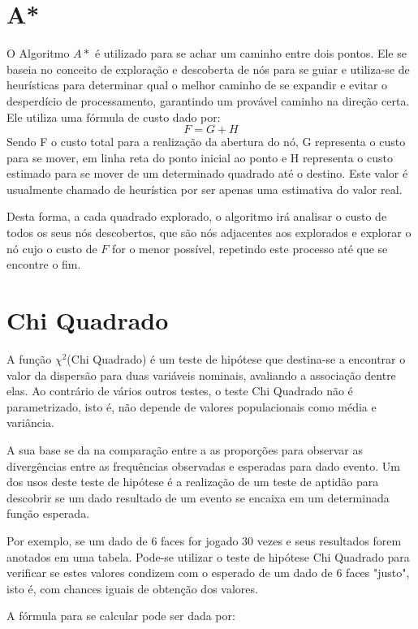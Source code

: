 \section{A*}
O Algoritmo $A*$ \cite{Astar} é utilizado para se achar um caminho entre dois pontos. Ele se baseia no conceito de exploração e descoberta de nós para se guiar e utiliza-se de heurísticas para determinar qual o melhor caminho de se expandir e evitar o desperdício de processamento, garantindo um provável caminho na direção certa. 
Ele utiliza uma fórmula de custo dado por:
\begin{equation}
	F = G + H
\end{equation}
Sendo F o custo total para a realização da abertura do nó, G representa o custo para se mover, em linha reta do ponto inicial ao ponto e H representa o custo estimado para se mover de um determinado quadrado até o destino. Este valor é usualmente chamado de heurística por ser apenas uma estimativa do valor real.

Desta forma, a cada quadrado explorado, o algoritmo irá analisar o custo de todos os seus nós descobertos, que são nós adjacentes aos explorados e explorar o nó cujo o custo de $F$ for o menor possível, repetindo este processo até que se encontre o fim. 

\section{Chi Quadrado}
A função $\chi^2$(Chi Quadrado) é um teste de hipótese que destina-se a encontrar o valor da dispersão para duas variáveis nominais, avaliando a associação dentre elas.
Ao contrário de vários outros testes, o teste Chi Quadrado não é parametrizado, isto é, não depende de valores populacionais como média e variância.

A sua base se da na comparação entre a as proporções para observar as divergências entre as frequências observadas e esperadas para dado evento. Um dos usos deste teste de hipótese é a realização de um teste de aptidão para descobrir se um dado resultado de um evento se encaixa em um determinada função esperada.

Por exemplo, se um dado de 6 faces for jogado 30 vezes e seus resultados forem anotados em uma tabela. Pode-se utilizar o teste de hipótese Chi Quadrado para verificar se estes valores condizem com o esperado de um dado de 6 faces "justo", isto é, com chances iguais de obtenção dos valores.

A fórmula para se calcular pode ser dada por:

